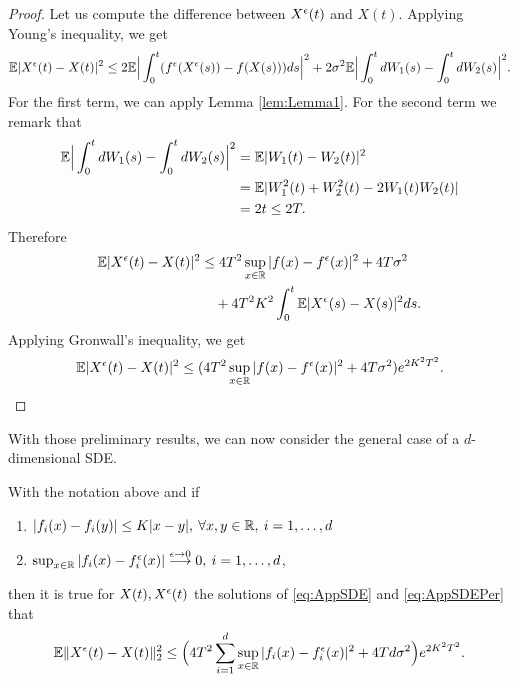 \begin{proof} Let us compute the difference between $X^\epsilon(t)$ and $X(t)$. Applying Young's inequality, we get
\begin{equation*}
	\mathbb{E} |X^\epsilon(t) - X(t)|^2 \leq 2\mathbb{E} \Big|\int_0^t (f^\epsilon (X^\epsilon(s)) - f(X(s)))ds \Big|^2 + 2\sigma^2 \mathbb{E} \Big|\int_0^t dW_1(s) - \int_0^t dW_2(s)  \Big|^2.
\end{equation*}
For the first term, we can apply Lemma \ref{lem:Lemma1}. For the second term we remark that
\begin{equation*}
\begin{aligned}
	\mathbb{E} \Big|\int_0^t dW_1(s) - \int_0^t dW_2(s)  \Big|^2 &= \mathbb{E} | W_1(t) - W_2(t) |^2 \\
		&= \mathbb{E} | W_1^2(t) + W_2^2(t) - 2W_1(t)W_2(t) | \\
		&= 2t \leq 2T.
\end{aligned}
\end{equation*}
Therefore
\begin{equation*}
\begin{aligned}
	\mathbb{E} |X^\epsilon(t) - X(t)|^2 &\leq 4T^2 \sup_{x\in \mathbb{R}}|f(x) - f^\epsilon(x)|^2 + 4T\sigma^2 \\
	&\quad + 4T^2K^2 \int_0^t \mathbb{E}|X^\epsilon(s) - X(s)|^2ds.
\end{aligned}
\end{equation*}
Applying Gronwall's inequality, we get
\begin{equation*}	
	\mathbb{E} |X^\epsilon(t) - X(t)|^2 \leq (4T^2 \sup_{x\in \mathbb{R}}|f(x) - f^\epsilon(x)|^2 + 4T\sigma^2) e^{2K^2T^2}.
\end{equation*}
\end{proof}
\noindent With those preliminary results, we can now consider the general case of a $d$-dimensional SDE.
\begin{theorem}\label{th:Prop} With the notation above and if
\begin{enumerate}
	\item $|f_i(x) - f_i(y)| \leq K|x - y|, \: \forall x,y \in \mathbb{R}, \: i = 1, \dots, d$
 	\item $\sup_{x\in \mathbb{R}}|f_i(x) - f_i^\epsilon(x)| \stackrel{\epsilon \rightarrow 0}\longrightarrow 0, \: i = 1, \dots, d$,
\end{enumerate}
then it is true for $X(t), X^\epsilon(t)$ the solutions of \eqref{eq:AppSDE} and \eqref{eq:AppSDEPer} that 
\begin{equation}\label{eq:Proposition}
	\mathbb{E} \| X^\epsilon(t) - X(t) \|_2^2 \leq \Big(4T^2 \sum_{i=1}^d \sup_{x\in \mathbb{R}}|f_i(x) - f_i^\epsilon(x)|^2 + 4Td\sigma^2\Big)e^{2K^2T^2}.
\end{equation}
\end{theorem}
